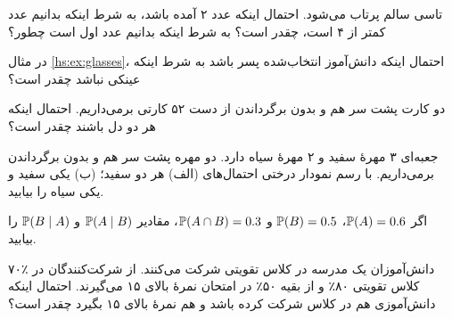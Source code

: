\begin{exercise}
تاسی سالم پرتاب می‌شود. احتمال اینکه عدد ۲ آمده باشد، به شرط اینکه بدانیم عدد کمتر از ۴ است، چقدر است؟ به شرط اینکه بدانیم عدد اول است چطور؟
\end{exercise}

\begin{exercise}
در مثال \ref{hs:ex:glasses}، احتمال اینکه دانش‌آموز انتخاب‌شده پسر باشد به شرط اینکه عینکی نباشد چقدر است؟
\end{exercise}

\begin{exercise}
دو کارت پشت سر هم و بدون برگرداندن از دست ۵۲ کارتی برمی‌داریم. احتمال اینکه هر دو دل باشند چقدر است؟
\end{exercise}

\begin{exercise}
جعبه‌ای ۳ مهرهٔ سفید و ۲ مهرهٔ سیاه دارد. دو مهره پشت سر هم و بدون برگرداندن برمی‌داریم. با رسم نمودار درختی احتمال‌های (الف) هر دو سفید؛ (ب) یکی سفید و یکی سیاه را بیابید.
\end{exercise}

\begin{exercise}
اگر $\P(A)=0.6$، $\P(B)=0.5$ و $\P(A\cap B)=0.3$، مقادیر $\P(A\mid B)$ و $\P(B\mid A)$ را بیابید.
\end{exercise}

\begin{exercise}
۷۰٪ دانش‌آموزان یک مدرسه در کلاس تقویتی شرکت می‌کنند. از شرکت‌کنندگان در کلاس تقویتی ۸۰٪ و از بقیه ۵۰٪ در امتحان نمرهٔ بالای ۱۵ می‌گیرند. احتمال اینکه دانش‌آموزی هم در کلاس شرکت کرده باشد و هم نمرهٔ بالای ۱۵ بگیرد چقدر است؟
\end{exercise}
